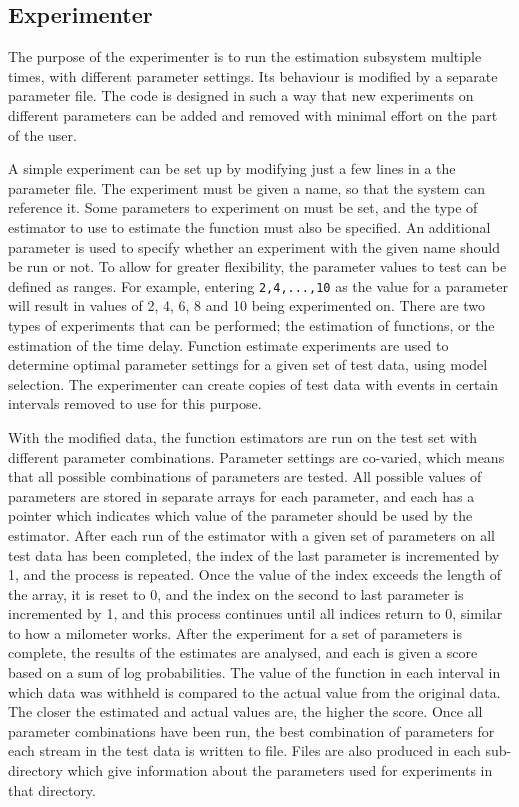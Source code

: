 \documentclass[a4paper,11pt,twoside]{article}
\begin{document}
\subsection{Experimenter}
\label{sec-6-9}

   The purpose of the experimenter is to run the estimation subsystem multiple
   times, with different parameter settings. Its behaviour is modified by a
   separate parameter file. The code is designed in such a way that new
   experiments on different parameters can be added and removed with minimal
   effort on the part of the user. 

   A simple experiment can be set up by modifying just a few lines in a the
   parameter file. The experiment must be given a name, so that the system can
   reference it. Some parameters to experiment on must be set, and the type of
   estimator to use to estimate the function must also be specified. An
   additional parameter is used to specify whether an experiment with the given
   name should be run or not. To allow for greater flexibility, the parameter
   values to test can be defined as ranges. For example, entering
   \texttt{2,4,...,10} as the value for a parameter will result in values of 2,
   4, 6, 8 and 10 being experimented on. There are two types of experiments that
   can be performed; the estimation of functions, or the estimation of the time
   delay. Function estimate experiments are used to determine optimal parameter
   settings for a given set of test data, using model selection. The
   experimenter can create copies of test data with events in certain intervals
   removed to use for this purpose.
   
   With the modified data, the function estimators are run on the test set with
   different parameter combinations. Parameter settings are co-varied, which
   means that all possible combinations of parameters are tested. All possible
   values of parameters are stored in separate arrays for each parameter, and
   each has a pointer which indicates which value of the parameter should be
   used by the estimator. After each run of the estimator with a given set of
   parameters on all test data has been completed, the index of the last
   parameter is incremented by 1, and the process is repeated. Once the value of
   the index exceeds the length of the array, it is reset to 0, and the index on
   the second to last parameter is incremented by 1, and this process continues
   until all indices return to 0, similar to how a milometer works. After the
   experiment for a set of parameters is complete, the results of the estimates
   are analysed, and each is given a score based on a sum of log
   probabilities. The value of the function in each interval in which data was
   withheld is compared to the actual value from the original data. The closer
   the estimated and actual values are, the higher the score. Once all parameter
   combinations have been run, the best combination of parameters for each
   stream in the test data is written to file. Files are also produced in each
   sub-directory which give information about the parameters used for
   experiments in that directory.
\end{document}
